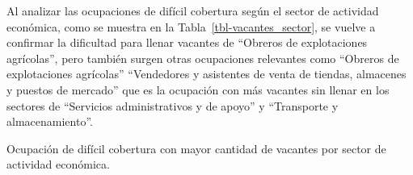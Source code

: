 \documentclass[
  11pt,
]{article}
\begin{document}
Al analizar las ocupaciones de difícil cobertura según el sector de
actividad económica, como se muestra en la
Tabla~\ref{tbl-vacantes_sector}, se vuelve a confirmar la dificultad
para llenar vacantes de ``Obreros de explotaciones agrícolas'', pero
también surgen otras ocupaciones relevantes como ``Obreros de
explotaciones agrícolas'' ``Vendedores y asistentes de venta de tiendas,
almacenes y puestos de mercado'' que es la ocupación con más vacantes
sin llenar en los sectores de ``Servicios administrativos y de apoyo'' y
``Transporte y almacenamiento''.

\begin{table}

\caption{\label{tbl-vacantes_sector}Ocupación de difícil cobertura con
mayor cantidad de vacantes por sector de actividad económica.}

\centering{

}
\end{table}
\end{document}
